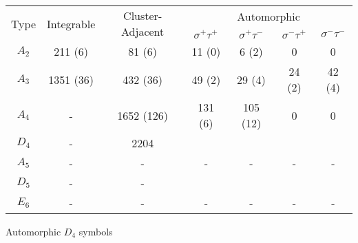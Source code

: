 \documentclass[12pt]{article}
\begin{document}
\begin{center}
\begin{tabular}{ | c | c | c | c | c | c |  c |}
\multicolumn{1}{c}{\multirow{2}{*}{Type}} & \multicolumn{1}{c}{\multirow{2}{*}{Integrable}} & \multicolumn{1}{c}{\multirow{2}{*}{Cluster-Adjacent}} & \multicolumn{4}{c}{Automorphic} \\
\multicolumn{1}{c}{} & \multicolumn{1}{c}{} & \multicolumn{1}{c}{} & \multicolumn{1}{c}{$\sigma^+ \tau^+$} & \multicolumn{1}{c}{$\sigma^+ \tau^-$} & \multicolumn{1}{c}{$\sigma^- \tau^+$} & \multicolumn{1}{c}{$\sigma^- \tau^-$} \\
\hline \(A_2\) & 211 (6) & 81 (6) & 11 (0) & 6 (2) & 0 & 0 \\ 
\hline \(A_3\) & 1351 (36) & 432 (36) & 49 (2) & 29 (4) & 24 (2) & 42 (4) \\ 
\hline \(A_4\) & - & 1652 (126) & 131 (6) & 105 (12) & 0 & 0 \\ 
\hline \(D_4\) & - & 2204  \\ 
\hline \(A_5\) & - & - & - & - & - & - \\ 
\hline \(D_5\) & - & -  \\ 
\hline \(E_6\) & - & - & - & - & - & -  \\ 
\hline
\end{tabular} 
\vspace{.6cm}

Automorphic $D_4$ symbols


\end{center}
\end{document}
